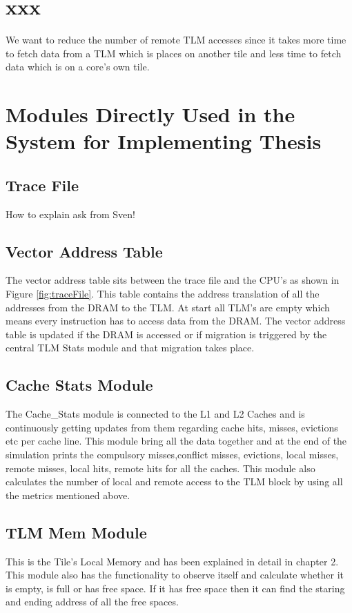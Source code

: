 \documentclass{listhesis}
\begin{document}
\section{xxx}
We want to reduce the number of remote TLM accesses since it takes more time to fetch data from a TLM which is places on another tile and less time to fetch data which is on a core's own tile.  
\section{Modules Directly Used in the System for Implementing Thesis}
\subsection{Trace File}
How to explain ask from Sven! 
\subsection{Vector Address Table}
The vector address table sits between the trace file and the CPU's as shown in Figure \ref{fig:traceFile}. This table contains the address translation of all the addresses from the DRAM to the TLM. At start all TLM's are empty which means every instruction has to access data from the DRAM. The vector address table is updated if the DRAM is accessed or if migration is triggered by the central TLM Stats module and that migration takes place.
\subsection{Cache Stats Module}
The Cache{\_}Stats module is connected to the L1 and L2 Caches and is continuously getting updates from them regarding cache hits, misses, evictions etc per cache line. This module bring all the data together and at the end of the simulation prints the compulsory misses,conflict misses, evictions, local misses, remote misses, local hits, remote hits for all the caches. This module also calculates the number of local and remote access to the TLM block by using all the metrics mentioned above.
\subsection{TLM Mem Module}
This is the Tile's Local Memory and has been explained in detail in chapter 2. This module also has the functionality to observe itself and calculate whether it is empty, is full or has free space. If it has free space then it can find the staring and ending address of all the free spaces. 
\end{document}
